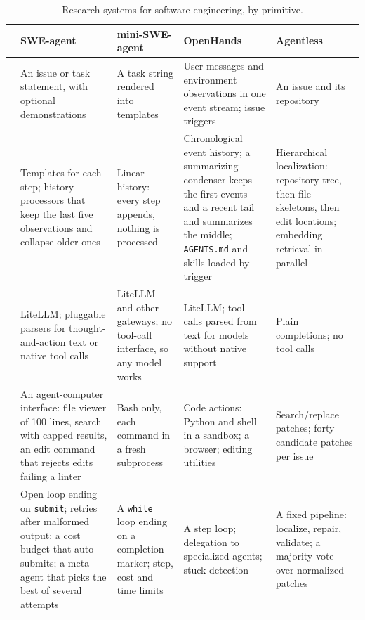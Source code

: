 \begin{table}[p]
\centering
\scriptsize
\setlength{\tabcolsep}{3pt}
\renewcommand{\arraystretch}{1.15}
\caption{Research systems for software engineering, by primitive.}
\label{tab:research}
\begin{tabularx}{\linewidth}{@{}>{\bfseries}p{1.95cm}YYYY@{}}
\toprule
& SWE-agent & mini-SWE-agent & OpenHands & Agentless \\
\midrule
{} &
An issue or task statement, with optional demonstrations &
A task string rendered into templates &
User messages and environment observations in one event stream; issue triggers &
An issue and its repository \\
\addlinespace
{} &
Templates for each step; history processors that keep the last five observations and collapse older ones &
Linear history: every step appends, nothing is processed &
Chronological event history; a summarizing condenser keeps the first events and a recent tail and summarizes the middle; \texttt{AGENTS.md} and skills loaded by trigger &
Hierarchical localization: repository tree, then file skeletons, then edit locations; embedding retrieval in parallel \\
\addlinespace
{}\newline{} &
LiteLLM; pluggable parsers for thought-and-action text or native tool calls &
LiteLLM and other gateways; no tool-call interface, so any model works &
LiteLLM; tool calls parsed from text for models without native support &
Plain completions; no tool calls \\
\addlinespace
{} &
An agent-computer interface: file viewer of 100 lines, search with capped results, an edit command that rejects edits failing a linter &
Bash only, each command in a fresh subprocess &
Code actions: Python and shell in a sandbox; a browser; editing utilities &
Search/replace patches; forty candidate patches per issue \\
\addlinespace
{} &
Open loop ending on \texttt{submit}; retries after malformed output; a cost budget that auto-submits; a meta-agent that picks the best of several attempts &
A \texttt{while} loop ending on a completion marker; step, cost and time limits &
A step loop; delegation to specialized agents; stuck detection &
A fixed pipeline: localize, repair, validate; a majority vote over normalized patches \\
\bottomrule
\end{tabularx}
\end{table}

